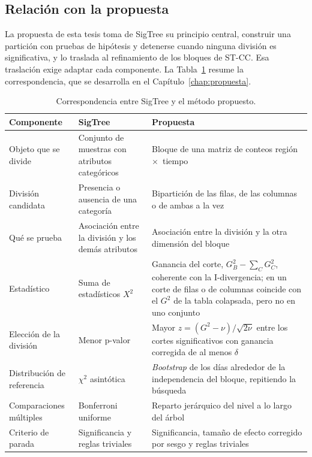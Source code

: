 \subsection{Relación con la propuesta}\label{sec:sigtree-propuesta}

La propuesta de esta tesis toma de SigTree su principio central, construir una
partición con pruebas de hipótesis y detenerse cuando ninguna división es
significativa, y lo traslada al refinamiento de los bloques de ST-CC. Esa
traslación exige adaptar cada componente. La Tabla~\ref{tab:sigtree-astcc} resume
la correspondencia, que se desarrolla en el Capítulo~\ref{chap:propuesta}.

\begin{table}[ht]
  \centering
  {\footnotesize
  \begin{tabular}{@{}>{\raggedright\arraybackslash}p{}
                  >{\raggedright\arraybackslash}p{}
                  >{\raggedright\arraybackslash}p{}@{}}
    \toprule
    \textbf{Componente} & \textbf{SigTree} & \textbf{Propuesta} \\
    \midrule
    Objeto que se divide & Conjunto de muestras con atributos categóricos &
      Bloque de una matriz de conteos región~$\times$~tiempo \\
    División candidata & Presencia o ausencia de una categoría &
      Bipartición de las filas, de las columnas o de ambas a la vez \\
    Qué se prueba & Asociación entre la división y los demás atributos &
      Asociación entre la división y la otra dimensión del bloque \\
    Estadístico & Suma de estadísticos $X^2$ & Ganancia del corte,
      $G^2_B - \sum_C G^2_C$, coherente con la I-divergencia; en un corte de
      filas o de columnas coincide con el $G^2$ de la tabla colapsada, pero no
      en uno conjunto \\
    Elección de la división & Menor p-valor & Mayor
      $z=(G^2-\nu)/\sqrt{2\nu}$ entre los cortes significativos con ganancia
      corregida de al menos $\delta$ \\
    Distribución de referencia & $\chi^2$ asintótica & \emph{Bootstrap} de los días
      alrededor de la independencia del bloque, repitiendo la búsqueda \\
    Comparaciones múltiples & Bonferroni uniforme & Reparto jerárquico del nivel
      a lo largo del árbol \\
    Criterio de parada & Significancia y reglas triviales & Significancia, tamaño
      de efecto corregido por sesgo y reglas triviales \\
    \bottomrule
  \end{tabular}
  }
  \caption{Correspondencia entre SigTree \citep{Hu2025} y el método propuesto.}
  \label{tab:sigtree-astcc}
\end{table}

